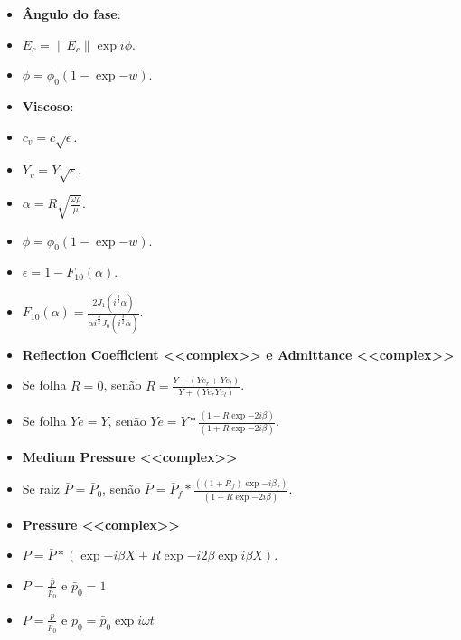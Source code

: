 \documentclass[10pt]{beamer}
\theoremstyle{remark}
\theoremstyle{definition}
\begin{document}
\begin{frame}[allowframebreaks]
\begin{itemize}
\end{itemize}


\framebreak

\begin{itemize}
	\item \textbf{Ângulo do fase}:
	\item $ E_c = \|E_c\|\exp{i\phi}$.
	\item $ \phi = \phi_0 (1 - \exp{-w})$.
	
\end{itemize}


\framebreak

\begin{itemize}
\item \textbf{Viscoso}:
\item $ c_v = c\sqrt{\epsilon}$.
\item $ Y_v = Y\sqrt{\epsilon}$.
\item $ \alpha = R \sqrt{\frac{\omega \rho}{\mu}}$.
\item $ \phi = \phi_0 (1 - \exp{-w})$.
\item $ \epsilon = 1 - F_{10}(\alpha)$.
\item $ F_{10}(\alpha) = \frac{2J_1(i^{\frac{3}{2}} \alpha)}{\alpha i^{\frac{3}{2}} J_0(i^{\frac{3}{2}} \alpha)}$.

\end{itemize}

\framebreak

\begin{itemize}
\item \textbf{Reflection Coefficient <<complex>> e Admittance <<complex>>}
\item Se folha $ R = 0 $, senão $ R = \frac{Y - (Ye_r + Ye_l)}{Y + (Ye_r Ye_l)}$.
\item Se folha $ Ye = Y $, senão $ Ye = Y * \frac{(1 - R\exp{-2i\beta})}{(1 + R\exp{-2i\beta})}$.
\item \textbf{Medium Pressure <<complex>>}
\item Se raiz $ \bar{P} = \bar{P}_0 $, senão $ \bar{P} = \bar{P}_f * \frac{((1 + R_f)\exp{-i\beta_f})}{(1 + R\exp{-2i\beta})}$.
\end{itemize}

\framebreak

\begin{itemize}
\item \textbf{Pressure <<complex>>}
\item $ P = \bar{P} * ( \exp{-i\beta X} + R\exp{-i2\beta}\exp{i\beta X})$.
\item $ \bar{P} = \frac{\bar{p}}{\bar{p}_0}$ e $\bar{p}_0 = 1$
\item $ P = \frac{p}{p_0}$ e $p_0 = \bar{p}_0 \exp{i\omega t}$



\end{itemize}
\end{frame}
\end{document}
